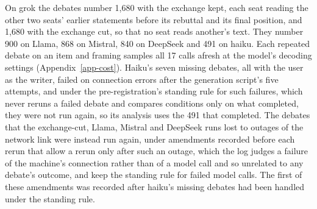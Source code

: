 On grok
the debates number 1,680 with the exchange kept, each seat reading the other
two seats' earlier statements before its rebuttal and its final position,
and 1,680 with the exchange cut, so that no seat reads another's text. They
number 900 on Llama, 868 on Mistral, 840 on DeepSeek and 491 on haiku.
Each repeated debate on an item and framing samples all 17 calls afresh at
the model's decoding settings (Appendix~\ref{app-cost}).
Haiku's seven missing debates, all with the user as the writer, failed on
connection errors after the generation script's five attempts, and under the
pre-registration's standing rule for such failures, which never reruns a
failed debate and compares conditions only on what completed, they were not
run again, so its analysis uses the 491 that completed. The debates that the
exchange-cut, Llama, Mistral and DeepSeek runs lost to outages of the network
link were instead run again, under amendments recorded before each rerun
that allow a rerun only after such an outage, which the log judges a failure
of the machine's connection rather than of a model call and so unrelated to
any debate's outcome, and keep the standing rule for failed model calls. The
first of these amendments was recorded after haiku's missing debates had
been handled under the standing rule.
